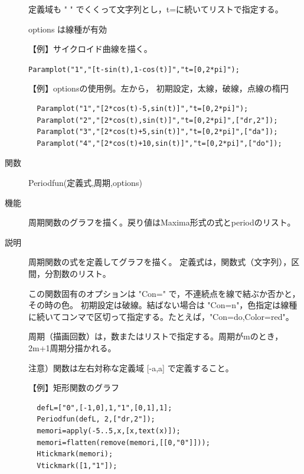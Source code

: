 \documentclass[papersize,a4paper,12pt,uplatex]{jsarticle}
\begin{document}
\begin{description}
定義域も " " でくくって文字列とし，t=に続いてリストで指定する。

options は線種が有効

\vspace{\baselineskip}
【例】サイクロイド曲線を描く。

\hspace{10mm} \verb|Paramplot("1","[t-sin(t),1-cos(t)]","t=[0,2*pi]");|

\vspace{\baselineskip}
\hspace{20mm}  

\vspace{\baselineskip}
【例】optionsの使用例。左から， 初期設定，太線，破線，点線の楕円
\begin{verbatim}
  Paramplot("1","[2*cos(t)-5,sin(t)]","t=[0,2*pi]");
  Paramplot("2","[2*cos(t),sin(t)]","t=[0,2*pi]",["dr,2"]);
  Paramplot("3","[2*cos(t)+5,sin(t)]","t=[0,2*pi]",["da"]);
  Paramplot("4","[2*cos(t)+10,sin(t)]","t=[0,2*pi]",["do"]);
\end{verbatim}
\begin{center}  \end{center}


\vspace{\baselineskip}
\hypertarget{periodfun}{}
\item[関数]  Periodfun(定義式,周期,options)
\item[機能]  周期関数のグラフを描く。戻り値はMaxima形式の式とperiodのリスト。
\item[説明]  周期関数の式を定義してグラフを描く。
定義式は，関数式（文字列），区間，分割数のリスト。

この関数固有のオプションは "Con=" で，不連続点を線で結ぶか否かと，その時の色。
 初期設定は破線。結ばない場合は "Con=n"，色指定は線種に続いてコンマで区切って指定する。たとえば，"Con=do,Color=red"。

周期（描画回数）は，数またはリストで指定する。周期がmのとき，2m+1周期分描かれる。


注意）関数は左右対称な定義域 [-a,a] で定義すること。

\vspace{\baselineskip}
【例】矩形関数のグラフ

\begin{verbatim}
  defL=["0",[-1,0],1,"1",[0,1],1];
  Periodfun(defL, 2,["dr,2"]);
  memori=apply(-5..5,x,[x,text(x)]);
  memori=flatten(remove(memori,[[0,"0"]]));
  Htickmark(memori);
  Vtickmark([1,"1"]);
\end{verbatim}


\end{description}
\end{document}
